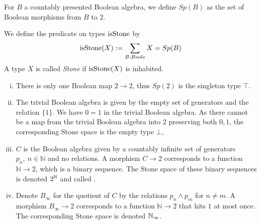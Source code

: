 \begin{definition}
  For $B$ a countably presented Boolean algebra, we define $Sp(B)$ as the set of Boolean morphisms from $B$ to $2$. 
\end{definition}
\begin{definition}
  We define the predicate on types $\mathrm{isStone}$ by 
  \begin{equation}
    \mathrm{isStone}(X) := \sum\limits_{B : Boole} X = Sp(B)
  \end{equation} 
  A type $X$ is called \textit{Stone} if $\mathrm{isStone}(X)$ is inhabited.
\end{definition}


\begin{example}
  \label{boolean-algebra-examples}
  \begin{enumerate}[(i)]
    \item There is only one Boolean map $2\to 2$, thus $Sp(2)$ is the singleton type $\top$. 
  \item   The trivial Boolean algebra is given by the empty set of generators and the relation $\{1\}$.
    We have $0=1$ in the trivial Boolean algebra. 
    As there cannot be a map from the trivial Boolean algebra into $2$ preserving both $0,1$, 
    the corresponding Stone space is the empty type $\bot$, 
  \item\label{ExampleBAunderCantor}   
    $C$ is the Boolean algebra given by a countably infinite set of generators $p_n, ~n\in\mathbb N$ and no relations. 
    A morphism $C\to 2$ corresponds to a function $\mathbb N\to 2$, which is a binary sequence. 
    The Stone space of these binary sequences is denoted $2^{\mathbb{N}}$ and called .
  \item\label{ExampleBAunderNinfty}
    Denote $B_\infty$ for the quotient of $C$ by the relations $p_n\wedge p_m$ for $n\neq m$. 
    A morphism $B_\infty\to 2$ corresponds to a function $\mathbb N \to 2$ that hits $1$ at most once. 
    The corresponding Stone space is denoted $\mathbb{N}_\infty$. 
  \end{enumerate}
\end{example}

